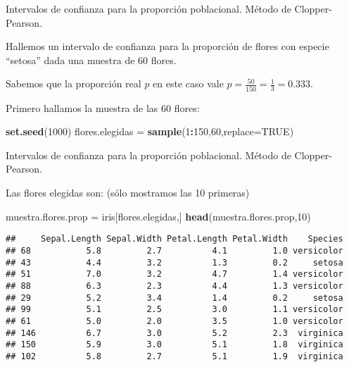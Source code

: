 \documentclass[ignorenonframetext,]{beamer}
\newenvironment{Shaded}{\begin{snugshade}}{\end{snugshade}}
\newcommand{\DataTypeTok}[1]{\textcolor[rgb]{0.13,0.29,0.53}{#1}}
\newcommand{\DecValTok}[1]{\textcolor[rgb]{0.00,0.00,0.81}{#1}}
\newcommand{\KeywordTok}[1]{\textcolor[rgb]{0.13,0.29,0.53}{\textbf{#1}}}
\newcommand{\NormalTok}[1]{#1}
\newcommand{\OperatorTok}[1]{\textcolor[rgb]{0.81,0.36,0.00}{\textbf{#1}}}
\newcommand{\OtherTok}[1]{\textcolor[rgb]{0.56,0.35,0.01}{#1}}
\newcommand{\StringTok}[1]{\textcolor[rgb]{0.31,0.60,0.02}{#1}}
\begin{document}
\begin{frame}[fragile]{Intervalos de confianza para la proporción
poblacional. Método de Clopper-Pearson.}
\protect\hypertarget{intervalos-de-confianza-para-la-proporcion-poblacional.-metodo-de-clopper-pearson.-2}{}

Hallemos un intervalo de confianza para la proporción de flores con
especie ``setosa'' dada una muestra de 60 flores.

Sabemos que la proporción real \(p\) en este caso vale
\(p=\frac{50}{150}=\frac{1}{3}=0.333\).

Primero hallamos la muestra de las 60 flores:

\begin{Shaded}
\begin{Highlighting}[]
\KeywordTok{set.seed}\NormalTok{(}\DecValTok{1000}\NormalTok{)}
\NormalTok{flores.elegidas =}\StringTok{ }\KeywordTok{sample}\NormalTok{(}\DecValTok{1}\OperatorTok{:}\DecValTok{150}\NormalTok{,}\DecValTok{60}\NormalTok{,}\DataTypeTok{replace=}\OtherTok{TRUE}\NormalTok{)}
\end{Highlighting}
\end{Shaded}

\end{frame}

\begin{frame}[fragile]{Intervalos de confianza para la proporción
poblacional. Método de Clopper-Pearson.}
\protect\hypertarget{intervalos-de-confianza-para-la-proporcion-poblacional.-metodo-de-clopper-pearson.-3}{}

Las flores elegidas son: (sólo mostramos las 10 primeras)

\begin{Shaded}
\begin{Highlighting}[]
\NormalTok{muestra.flores.prop =}\StringTok{ }\NormalTok{iris[flores.elegidas,]}
\KeywordTok{head}\NormalTok{(muestra.flores.prop,}\DecValTok{10}\NormalTok{)}
\end{Highlighting}
\end{Shaded}

\begin{verbatim}
##     Sepal.Length Sepal.Width Petal.Length Petal.Width    Species
## 68           5.8         2.7          4.1         1.0 versicolor
## 43           4.4         3.2          1.3         0.2     setosa
## 51           7.0         3.2          4.7         1.4 versicolor
## 88           6.3         2.3          4.4         1.3 versicolor
## 29           5.2         3.4          1.4         0.2     setosa
## 99           5.1         2.5          3.0         1.1 versicolor
## 61           5.0         2.0          3.5         1.0 versicolor
## 146          6.7         3.0          5.2         2.3  virginica
## 150          5.9         3.0          5.1         1.8  virginica
## 102          5.8         2.7          5.1         1.9  virginica
\end{verbatim}

\end{frame}
\end{document}
